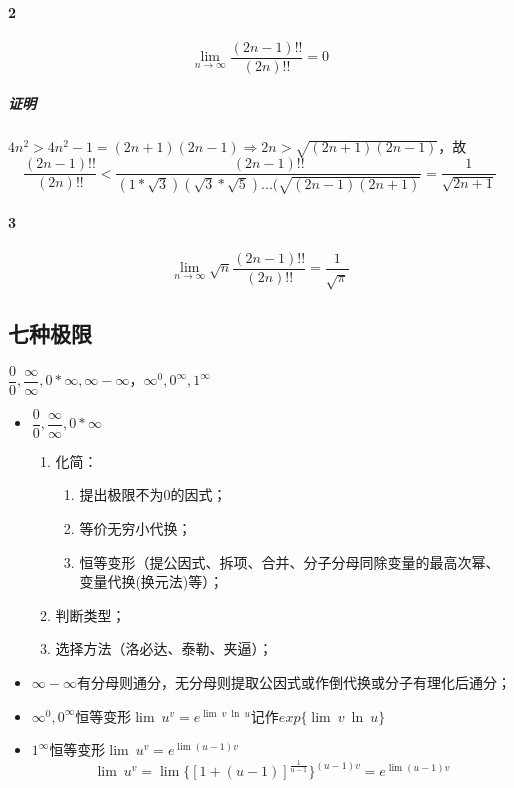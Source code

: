 \paragraph{2}
\[\lim_{n \to \infty}\dfrac{(2n - 1)!!}{(2n)!!} = 0\]
\subparagraph{证明}
\(4n^2 > 4n^2 - 1 = (2n + 1)(2n - 1) \Rightarrow 2n > \sqrt{(2n + 1)(2n - 1)}\)，故
\[\dfrac{(2n - 1)!!}{(2n)!!} < \dfrac{(2n - 1)!!}{(1 * \sqrt{3})(\sqrt{3} * \sqrt{5})...(\sqrt{(2n - 1)(2n + 1)}} = \dfrac{1}{\sqrt{2n + 1}}\]

\paragraph{3}
\[\lim_{n \to \infty}\sqrt{n}\dfrac{(2n - 1)!!}{(2n)!!} = \dfrac{1}{\sqrt{\pi}}\]


\subsection{七种极限}
\(\dfrac{0}{0}, \dfrac{\infty}{\infty}, 0 * \infty, \infty - \infty， \infty^0, 0^{\infty}, 1^{\infty}\)

\begin{itemize}
    \item \(\dfrac{0}{0}, \dfrac{\infty}{\infty}, 0 * \infty\)\begin{enumerate}
        \item 化简：\begin{enumerate}
            \item 提出极限不为0的因式；
            \item 等价无穷小代换；
            \item 恒等变形（提公因式、拆项、合并、分子分母同除变量的最高次幂、变量代换(换元法)等）；
        \end{enumerate}
        \item 判断类型；
        \item 选择方法（洛必达、泰勒、夹逼）；
    \end{enumerate}
    \item \(\infty - \infty\)有分母则通分，无分母则提取公因式或作倒代换或分子有理化后通分；
    \item \(\infty^0, 0^{\infty}\)恒等变形\(\lim\ u^v = e^{\lim\ v\ \ln\ u} \text{记作}exp\{\lim\ v\ \ln\ u\}\)
    \item \(1^{\infty}\)恒等变形\(\lim\ u^v = e^{\lim(u - 1)v}\)
    \[\lim\ u^v = \lim\{[1 + (u - 1)]^{\frac{1}{u - 1}}\}^{(u - 1)v} = e^{\lim(u - 1)v}\]
\end{itemize}


